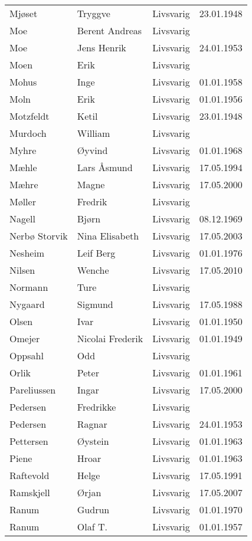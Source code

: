 \begin{longtable}{llll}
Mjøset	&	Tryggve	&	Livsvarig 	&	23.01.1948	\\
Moe	&	Berent Andreas	&	Livsvarig 	&		\\
Moe	&	Jens Henrik	&	Livsvarig 	&	24.01.1953	\\
Moen	&	Erik	&	Livsvarig 	&		\\
Mohus	&	Inge	&	Livsvarig 	&	01.01.1958	\\
Moln	&	Erik	&	Livsvarig 	&	01.01.1956	\\
Motzfeldt	&	Ketil	&	Livsvarig 	&	23.01.1948	\\
Murdoch	&	William	&	Livsvarig 	&		\\
Myhre	&	Øyvind	&	Livsvarig 	&	01.01.1968	\\
Mæhle	&	Lars Åsmund	&	Livsvarig 	&	17.05.1994	\\
Mæhre	&	Magne	&	Livsvarig	&	17.05.2000	\\
Møller	&	Fredrik	&	Livsvarig 	&		\\
Nagell	&	Bjørn	&	Livsvarig 	&	08.12.1969	\\
Nerbø Storvik 	&	Nina Elisabeth	&	Livsvarig	&	17.05.2003	\\
Nesheim	&	Leif Berg	&	Livsvarig 	&	01.01.1976	\\
Nilsen	&	Wenche	&	Livsvarig	&	17.05.2010	\\
Normann	&	Ture	&	Livsvarig 	&		\\
Nygaard	&	Sigmund	&	Livsvarig 	&	17.05.1988	\\
Olsen	&	Ivar	&	Livsvarig 	&	01.01.1950	\\
Omejer	&	Nicolai Frederik	&	Livsvarig 	&	01.01.1949	\\
Oppsahl	&	Odd	&	Livsvarig 	&		\\
Orlik	&	Peter	&	Livsvarig 	&	01.01.1961	\\
Pareliussen	&	Ingar	&	Livsvarig	&	17.05.2000	\\
Pedersen	&	Fredrikke	&	Livsvarig 	&		\\
Pedersen	&	Ragnar	&	Livsvarig 	&	24.01.1953	\\
Pettersen	&	Øystein	&	Livsvarig 	&	01.01.1963	\\
Piene	&	Hroar	&	Livsvarig 	&	01.01.1963	\\
Raftevold	&	Helge	&	Livsvarig 	&	17.05.1991	\\
Ramskjell	&	Ørjan	&	Livsvarig	&	17.05.2007	\\
Ranum	&	Gudrun	&	Livsvarig 	&	01.01.1970	\\
Ranum	&	Olaf T.	&	Livsvarig 	&	01.01.1957	\\

\end{longtable}

